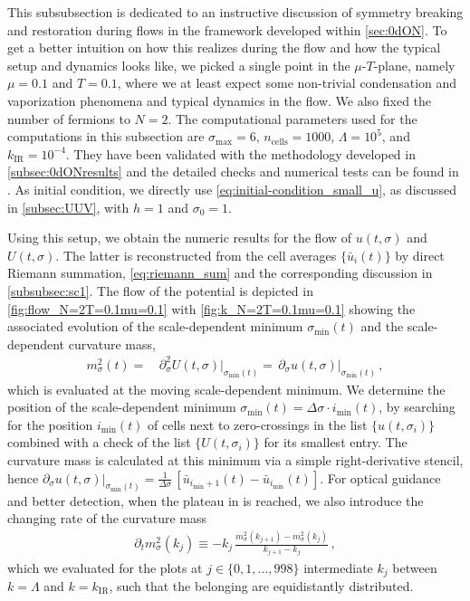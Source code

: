 This subsubsection is dedicated to an instructive discussion of symmetry breaking and restoration during \frg{} flows in the framework developed within \cref{sec:0dON}.
To get a better intuition on how this realizes during the \frg{} flow and how the typical setup and dynamics looks like, we picked a single point in the $\mu$-$T$-plane, namely $\mu = 0.1$ and $T = 0.1$, where we at least expect some non-trivial condensation and vaporization phenomena and typical dynamics in the \frg{} flow. We also fixed the number of fermions to $N = 2$.
The computational parameters used for the computations in this subsection are $\sigma_\mathrm{max}=6$, $n_\mathrm{cells}=1000$, $\Lambda=10^{5}$, and $k_\mathrm{IR}=10^{-4}$.
They have been validated with the methodology developed in \cref{subsec:0dONresults} and the detailed checks and numerical tests can be found in \gnAppNum{}.
As \uv{} initial condition, we directly use \cref{eq:initial-condition_small_u}, as discussed in \cref{subsec:UUV}, with $h=1$ and $\sigma_0=1$.

Using this setup, we obtain the numeric results for the \frg{} flow of $u ( t, \sigma )$ and $U ( t, \sigma )$.
The latter is reconstructed from the cell averages $\{ \bar{u}_i ( t ) \}$ by direct Riemann summation, \cf{} \cref{eq:riemann_sum} and the corresponding discussion in \cref{subsubsec:sc1}.
The \frg{} flow of the potential is depicted in \cref{fig:flow_N=2T=0.1mu=0.1} with \cref{fig:k_N=2T=0.1mu=0.1} showing the associated evolution of the scale-dependent minimum $\sigma_\mathrm{min} ( t )$ and the scale-dependent curvature mass,
		\begin{align}
		m^2_{\sigma} ( t ) = \, & \partial_\sigma^2 U ( t, \sigma )\big|_{\sigma_{\min}(t)} =	\, \partial_\sigma u ( t, \sigma )\big|_{\sigma_{\min}(t)} \, ,
	\end{align}
which is evaluated at the moving scale-dependent minimum.
We determine the position of the scale-dependent minimum ${\sigma_\mathrm{min} ( t ) = \Delta \sigma \cdot i_\mathrm{min} ( t )}$, by searching for the position $i_\mathrm{min} ( t )$ of cells next to zero-crossings in the list $\{ u ( t, \sigma_i ) \}$ combined with a check of the list $\{ U ( t, \sigma_i ) \}$ for its smallest entry. 
The curvature mass is calculated at this minimum via a simple right-derivative stencil, hence $\partial_\sigma u ( t, \sigma ) \big|_{\sigma_\mathrm{min} ( t )} = \frac{1}{\Delta \sigma} \, [ \bar{u}_{i_\mathrm{min} + 1} ( t )- \bar{u}_{i_\mathrm{min}} ( t ) ]$.
For optical guidance and better detection, when the plateau in \ir{} is reached, we also introduce the changing rate of the curvature mass
	\begin{align}
		\partial_t m_\sigma^2 ( k_j ) \equiv - k_j \, \frac{m^2_\sigma( k_{j + 1} ) - m^2_\sigma ( k_j )}{  k_{j + 1} - k_j} \, ,	\label{eq:changing_rate_mass}
	\end{align}
which we evaluated for the plots at $j \in \{ 0, 1, \ldots, 998 \}$ intermediate \rgscales{} $k_j$ between $k = \Lambda$ and $k = k_\mathrm{IR}$, such that the belonging \rgtimes{} are equidistantly distributed.

